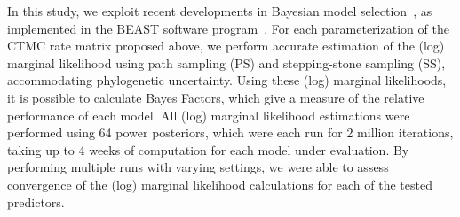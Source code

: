 \documentclass[10pt]{article}
\begin{document}
In this study, we exploit recent developments in Bayesian model selection~\cite{Baele2012,Baele2013a,Baele2013b}, as implemented in the BEAST software program~\cite{beast2012}.
For each parameterization of the CTMC rate matrix proposed above, we perform accurate estimation of the (log) marginal likelihood using path sampling (PS) and stepping-stone sampling (SS), accommodating phylogenetic uncertainty.
Using these (log) marginal likelihoods, it is possible to calculate Bayes Factors, which give a measure of the relative performance of each model. 
All (log) marginal likelihood estimations were performed using 64 power posteriors, which were each run for 2 million iterations, taking up to 4 weeks of computation for each model under evaluation.
By performing multiple runs with varying settings, we were able to assess convergence of the (log) marginal likelihood calculations for each of the tested predictors.

\end{document}
